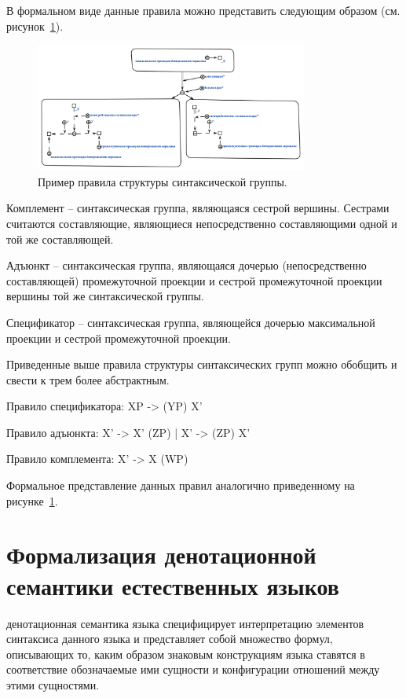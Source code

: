 В формальном виде данные правила можно представить следующим образом (см.
рисунок~\ref{fig:pic_tree_structure_rule}).

\begin{figure}[h]
    \centering
    \includegraphics[width=0.8\textwidth]{images/part2/chapter_lang/tree_structure_rule.png}
    \caption{Пример правила структуры синтаксической группы.}
    \label{fig:pic_tree_structure_rule}
\end{figure}

Комплемент -- синтаксическая группа, являющаяся сестрой вершины.
Сестрами считаются составляющие, являющиеся непосредственно составляющими одной и той же составляющей.

Адъюнкт -- синтаксическая группа, являющаяся дочерью (непосредственно составляющей) промежуточной проекции и сестрой промежуточной проекции вершины той же синтаксической группы.

Спецификатор -- синтаксическая группа, являющейся дочерью максимальной проекции и сестрой промежуточной проекции.

Приведенные выше правила структуры синтаксических групп можно обобщить и свести к трем более абстрактным.

Правило спецификатора: XP -> (YP) X'

Правило адъюнкта: X' -> X' (ZP) | X' -> (ZP) X'

Правило комплемента: X' -> X (WP)

Формальное представление данных правил аналогично приведенному на рисунке~\ref{fig:pic_tree_structure_rule}.

\section{Формализация денотационной семантики естественных языков}
\label{section_natural_language_denotational_semantics_formalization}

денотационная семантика языка специфицирует интерпретацию элементов синтаксиса данного языка и представляет собой множество формул, описывающих то, каким образом знаковым конструкциям языка ставятся в соответствие обозначаемые ими сущности и конфигурации отношений между этими сущностями.

